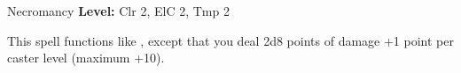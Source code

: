 {Necromancy}
{
	\textbf{Level:}
	Clr 2, ElC 2, Tmp 2\\
}
{
	This spell functions like , except that you deal 2d8 points of damage +1 point per caster level (maximum +10).

}
